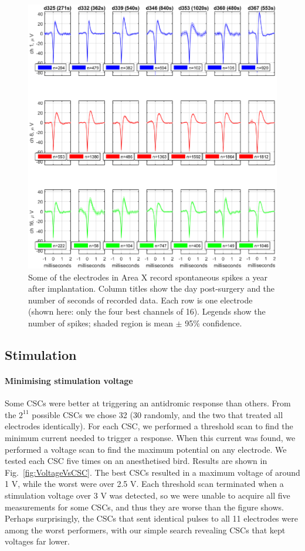 \documentclass[10pt,letterpaper]{article}
\newcommand\fig[1]{Fig.~\ref{#1}}
\renewcommand{\subsubsection}[1]{\paragraph{#1}}
\begin{document}
\begin{figure}
  \includegraphics[width=\textwidth]{XSpikeRecording}
  \caption{Some of the electrodes in Area X record spontaneous spikes a year after implantation.  Column titles show the day post-surgery and the number of seconds of recorded data.  Each row is one electrode (shown here: only the four best channels of 16).  Legends show the number of spikes; shaded region is mean $\pm$ 95\% confidence.}
  \label{fig:XSpikeRecording}
\end{figure}


\subsection{Stimulation}

\subsubsection{Minimising stimulation voltage}

Some CSCs were better at triggering an antidromic response than others.  From the $2^{11}$ possible CSCs we chose 32 (30 randomly, and the two that treated all electrodes identically).  For each CSC, we performed a threshold scan to find the minimum current needed to trigger a response.  When this current was found, we performed a voltage scan to find the maximum potential on any electrode.  We tested each CSC five times on an anesthetised bird.  Results are shown in \fig{fig:VoltageVsCSC}.  The best CSCs resulted in a maximum voltage of around 1 V, while the worst were over 2.5 V.  Each threshold scan terminated when a stimulation voltage over 3 V was detected, so we were unable to acquire all five measurements for some CSCs, and thus they are worse than the figure shows.  Perhaps surprisingly, the CSCs that sent identical pulses to all 11 electrodes were among the worst performers, with our simple search revealing CSCs that kept voltages far lower.
\end{document}
